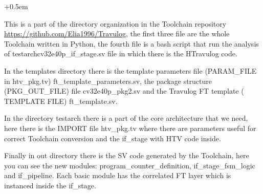 {{\begin{footnotesize}
        \openup +0.5em
        
	    \end{footnotesize}
    
	    This is a part of the directory organization in the Toolchain repository \url{https://github.com/Elia1996/Travulog}, the first three file are the whole Toolchain written in Python, the fourth file is a bash script that run the analysis of \/test\/arch\/cv32e40p\_if\_stage.sv file in which there is the HTravulog code.
	    
	    In the templates directory there is the template parameters file (PARAM\_FILE in htv\_pkg.tv) ft\_template\_parameters.sv, the package structure (PKG\_OUT\_FILE) file  cv32e40p\_pkg2.sv and the Travulog FT template ( TEMPLATE FILE) ft\_template.sv. 
	    
	    In the directory test\/arch there is a part of the core architecture that we need, here there is the IMPORT file htv\_pkg.tv where there are parameters useful for correct Toolchain conversion and the if\_stage with HTV code inside.
	    
	    Finally in out directory there is the SV code generated by the Toolchain, here you can see the new modules: program\_counter\_definition, if\_stage\_fsm\_logic and if\_pipeline. Each basic module has the correlated FT layer which is instanced inside the if\_stage.
	    
	    
	}%

		

}
